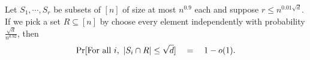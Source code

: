 \begin{lemma}\label{lem:single-step-fanin-reduction}
Let $S_1,\cdots, S_r$ be subsets of $[n]$ of size at most $n^{0.9}$ each and suppose $r \leq n^{0.01 \sqrt{d}}$. If we pick a set $R \subseteq [n]$ by choose every element independently with probability $\frac{\sqrt{d}}{n^{0.92}}$, then
\[
\Pr[\text{For all $i$, } \left|S_i \cap R\right| \leq \sqrt{d}] \quad = \quad 1 - o(1).
\]
\end{lemma}











